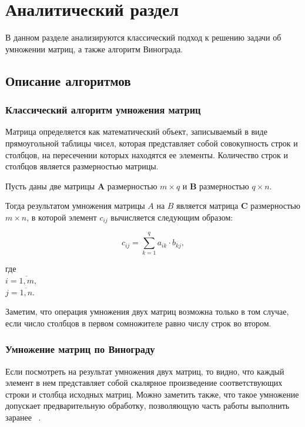 \documentclass[a4paper,12pt]{article}
\begin{document}
\section{Аналитический раздел}

В данном разделе анализируются классический подход
к решению задачи об умножении матриц, а также
алгоритм Винограда. 

\subsection{Описание алгоритмов}

\subsubsection{Классический алгоритм умножения матриц}

Матрица определяется как математический объект, 
записываемый в виде 
прямоугольной таблицы чисел, которая представляет 
собой совокупность строк 
и столбцов, на пересечении которых находятся ее 
элементы. Количество строк и столбцов является 
размерностью матрицы.

Пусть даны две матрицы $\mathbf{A}$ размерностью
$m \times q$ и $\mathbf{B}$ размерностью $q \times n$. 

Тогда результатом умножения матрицы $A$ на $B$
является матрица $\mathbf{C}$ размерностью $m \times n$,
в которой элемент $c_{ij}$ вычисляется 
следующим образом:

\[
c_{ij} = \sum_{k=1}^q a_{ik} \cdot b_{kj},
\]

\begin{flushleft}
	где \\
	$i = \overline{1, m},$ \\
	$j = \overline{1, n}.$
\end{flushleft}

Заметим, что операция умножения двух матриц возможна 
только в том случае, если число столбцов в первом сомножителе равно числу строк во втором.

\subsubsection{Умножение матриц по Винограду}

Если посмотреть на результат умножения двух матриц, то видно, что каждый элемент в нем представляет собой скалярное произведение соответствующих строки и столбца исходных матриц. Можно заметить также, что такое умножение допускает предварительную обработку, позволяющую часть работы выполнить заранее
~\cite{mcconell}.
\end{document}
